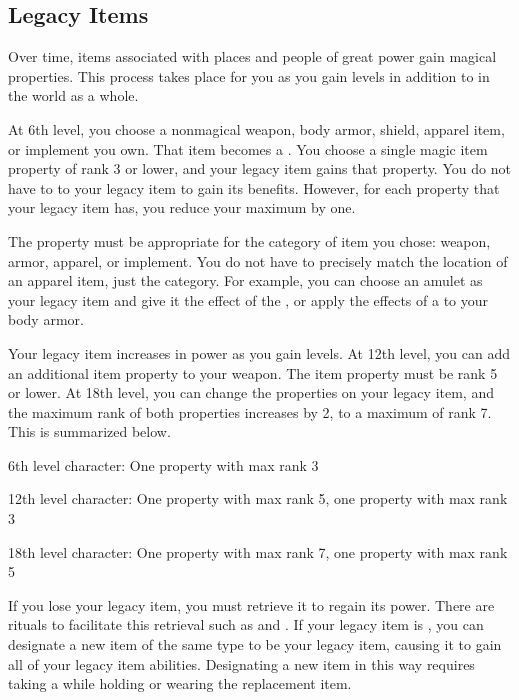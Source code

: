     \subsection{Legacy Items}\label{Legacy Items}

        Over time, items associated with places and people of great power gain magical properties.
        This process takes place for you as you gain levels in addition to in the world as a whole.

        At 6th level, you choose a nonmagical weapon, body armor, shield, apparel item, or implement you own.
        That item becomes a .
        You choose a single magic item property of rank 3 or lower, and your legacy item gains that property.
        You do not have to  to your legacy item to gain its benefits.
        However, for each  property that your legacy item has, you reduce your maximum  by one.

        The property must be appropriate for the category of item you chose: weapon, armor, apparel, or implement.
        You do not have to precisely match the location of an apparel item, just the category.
        For example, you can choose an amulet as your legacy item and give it the effect of the , or apply the effects of a  to your body armor.

        Your legacy item increases in power as you gain levels.
        At 12th level, you can add an additional item property to your weapon.
        The item property must be rank 5 or lower.
        At 18th level, you can change the properties on your legacy item, and the maximum rank of both properties increases by 2, to a maximum of rank 7.
        This is summarized below.
        \begin{raggeditemize}
            \item 6th level character: One property with max rank 3
            \item 12th level character: One property with max rank 5, one property with max rank 3
            \item 18th level character: One property with max rank 7, one property with max rank 5
        \end{raggeditemize}

        If you lose your legacy item, you must retrieve it to regain its power.
        There are rituals to facilitate this retrieval such as  and .
        If your legacy item is , you can designate a new item of the same type to be your legacy item, causing it to gain all of your legacy item abilities.
        Designating a new item in this way requires taking a  while holding or wearing the replacement item.

